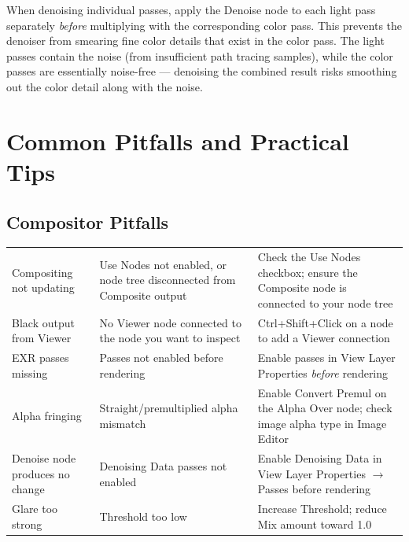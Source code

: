 \begin{tipbox}
When denoising individual passes, apply the Denoise node to each light pass separately \textit{before} multiplying with the corresponding color pass. This prevents the denoiser from smearing fine color details that exist in the color pass. The light passes contain the noise (from insufficient path tracing samples), while the color passes are essentially noise-free --- denoising the combined result risks smoothing out the color detail along with the noise.
\end{tipbox}

\section{Common Pitfalls and Practical Tips}
\label{sec:compositing-pitfalls}

\subsection{Compositor Pitfalls}

\vspace{0.5em}
\begin{tabularx}{\textwidth}{L{3cm} L{3.5cm} X}
\toprule
{}
 &  &  \\
\midrule
Compositing not updating & Use Nodes not enabled, or node tree disconnected from Composite output & Check the Use Nodes checkbox; ensure the Composite node is connected to your node tree \\
Black output from Viewer & No Viewer node connected to the node you want to inspect & Ctrl+Shift+Click on a node to add a Viewer connection \\
EXR passes missing & Passes not enabled before rendering & Enable passes in View Layer Properties \textit{before} rendering \\
Alpha fringing & Straight/premultiplied alpha mismatch & Enable Convert Premul on the Alpha Over node; check image alpha type in Image Editor \\
Denoise node produces no change & Denoising Data passes not enabled & Enable Denoising Data in View Layer Properties $\rightarrow$ Passes before rendering \\
Glare too strong & Threshold too low & Increase Threshold; reduce Mix amount toward 1.0 \\
\bottomrule
\end{tabularx}
\vspace{0.5em}

